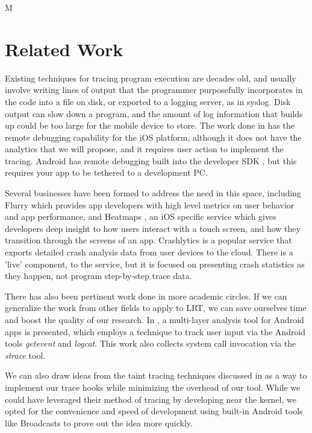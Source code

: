 M
\section{Related Work}
\label{section:relatedwork}
Existing techniques for tracing program execution are decades old, and usually involve writing lines of output that the programmer purposefully incorporates 
in the code into a file on disk, or exported to a logging server, as in syslog. 
Disk output can slow down a program, and the amount of log information that 
builds up could be too large for the mobile device to store. The work done in 
\cite{NSLogger} has the remote debugging capability for the iOS platform, although 
it does not have the analytics that we will propose, and it requires user action 
to implement the tracing. Android has remote debugging built into the developer 
SDK \cite{AndroidRemoteDebugTool}, but this requires your app to be tethered to a development PC.

Several businesses have been formed to address the need in this space, including
Flurry \cite{Flurry} which provides app developers with high level metrics on
user behavior and app performance, and Heatmaps \cite{Heatmaps}, an iOS specific
service which gives developers deep insight to how users interact with a touch
screen, and how they transition through the screens of an app. 
Crashlytics \cite{Crashlytics} is a popular service that exports detailed
crash analysis data from user devices to the cloud. There is a 'live' component,
to the service, but it is focused on presenting crash statistics as they happen,
not program step-by-step trace data.

There has also been pertinent work done in more academic circles. If we can 
generalize the work from other fields to apply to LRT, we can save ourselves 
time and boost the quality of our research. In \cite{ProfileDroid}, a 
multi-layer analysis tool for Android apps is presented, which employs a 
technique to track user input via the Android tools \emph{getevent} and \emph{logcat}. 
This work also collects system call invocation via the \emph{strace} tool. 

We can also draw ideas from the taint tracing techniques discussed in 
\cite{TaintDroid} as a way to implement our trace hooks while minimizing 
the overhead of our tool. While we could have leveraged their method of 
tracing by developing near the kernel, we opted for the convenience and 
speed of development using built-in Android tools like Broadcasts to prove
out the idea more quickly. 

